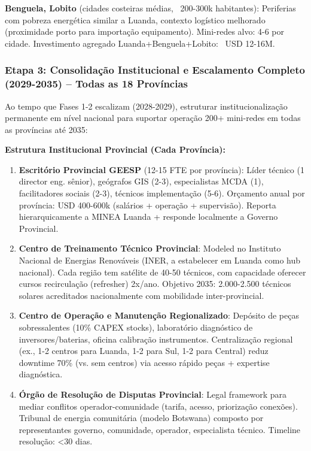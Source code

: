 \documentclass[12pt, a4paper]{article}
\begin{document}
{{{{{{{{{{{{\textbf{Benguela, Lobito} (cidades costeiras médias, ~200-300k habitantes): Periferias com pobreza energética similar a Luanda, contexto logístico melhorado (proximidade porto para importação equipamento). Mini-redes alvo: 4-6 por cidade. Investimento agregado Luanda+Benguela+Lobito: ~USD 12-16M.

\subsubsection{Etapa 3: Consolidação Institucional e Escalamento Completo (2029-2035) -- Todas as 18 Províncias}

Ao tempo que Fases 1-2 escalizam (2028-2029), estruturar institucionalização permanente em nível nacional para suportar operação 200+ mini-redes em todas as províncias até 2035:

\textbf{Estrutura Institucional Provincial (Cada Província):}

\begin{enumerate}
\item \textbf{Escritório Provincial GEESP} (12-15 FTE por província): Líder técnico (1 director eng. sênior), geógrafos GIS (2-3), especialistas MCDA (1), facilitadores sociais (2-3), técnicos implementação (5-6). Orçamento anual por província: USD 400-600k (salários + operação + supervisão). Reporta hierarquicamente a MINEA Luanda + responde localmente a Governo Provincial.

\item \textbf{Centro de Treinamento Técnico Provincial}: Modeled no Instituto Nacional de Energias Renováveis (INER, a estabelecer em Luanda como hub nacional). Cada região tem satélite de 40-50 técnicos, com capacidade oferecer cursos recirculação (refresher) 2x/ano. Objetivo 2035: 2.000-2.500 técnicos solares acreditados nacionalmente com mobilidade inter-provincial.

\item \textbf{Centro de Operação e Manutenção Regionalizado}: Depósito de peças sobressalentes (10\% CAPEX stocks), laboratório diagnóstico de inversores/baterias, oficina calibração instrumentos. Centralização regional (ex., 1-2 centros para Luanda, 1-2 para Sul, 1-2 para Central) reduz downtime 70\% (vs. sem centros) via acesso rápido peças + expertise diagnóstica.

\item \textbf{Órgão de Resolução de Disputas Provincial}: Legal framework para mediar conflitos operador-comunidade (tarifa, acesso, priorização conexões). Tribunal de energia comunitária (modelo Botswana) composto por representantes governo, comunidade, operador, especialista técnico. Timeline resolução: <30 dias.
\end{enumerate}

}}}}}}}}}}}}
\end{document}
